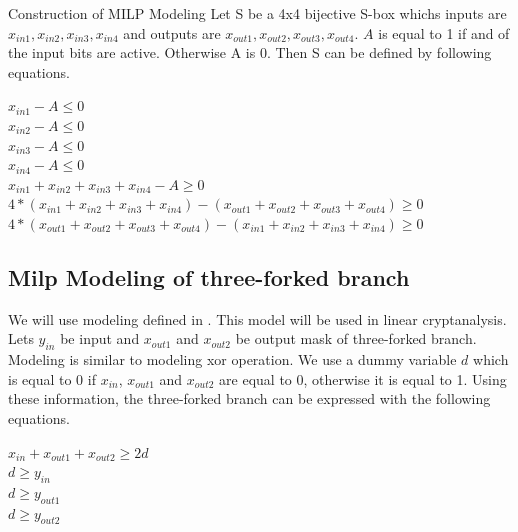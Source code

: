 \begin{section}{Construction of MILP Modeling}
Let S be a 4x4 bijective S-box whichs inputs are $x_{in1},x_{in2},x_{in3},x_{in4}$ and outputs are $x_{out1},x_{out2},x_{out3},x_{out4}$. $A$ is equal to 1 if and of the input bits are active. Otherwise A is 0. Then S can be defined by following equations.

\begin{center}
    $x_{in1} - A \leq 0$ \\
    $x_{in2} - A \leq 0$ \\
    $x_{in3} - A \leq 0$ \\
    $x_{in4} - A \leq 0$ \\
    $x_{in1} + x_{in2} + x_{in3} + x_{in4} - A \geq 0$ \\
    $4*(x_{in1} + x_{in2} + x_{in3} + x_{in4}) - (x_{out1} + x_{out2} + x_{out3} + x_{out4}) \geq 0$ \\
    $4*(x_{out1} + x_{out2} + x_{out3} + x_{out4}) - (x_{in1} + x_{in2} + x_{in3} + x_{in4}) \geq 0$ \\
\end{center}

\subsection{Milp Modeling of three-forked branch }

We will use modeling defined in \cite{mouha2012differential}. This model will be used in linear cryptanalysis. Lets $y_{in}$ be input and $x_{out1}$ and $x_{out2}$ be output mask of three-forked branch. Modeling is similar to modeling xor operation. We use a dummy variable $d$ which is equal to 0 if $x_{in}$, $x_{out1}$ and $x_{out2}$ are equal to 0, otherwise it is equal to 1. Using these information, the three-forked branch can be expressed with the following equations.

\begin{center}
    $x_{in} + x_{out1} + x_{out2} \geq 2d $ \\
    $d \geq y_{in} $ \\
    $d \geq y_{out1} $ \\
    $d \geq y_{out2} $ 
\end{center}

\end{section}